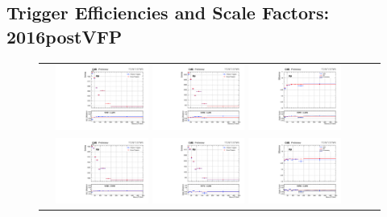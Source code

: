 \clearpage
\subsection{Trigger Efficiencies and Scale Factors: 2016postVFP}
\label{TrigSFResults2016postVFP}

\begin{figure}[!htb]
  \begin{center}
    \begin{tabular}{ccc}
      \includegraphics[width=0.30\textwidth]{fig_2016postVFP_TrigSF/g_lepApt_emu_MC.pdf}
      \includegraphics[width=0.30\textwidth]{fig_2016postVFP_TrigSF/g_lepApt_emu_data.pdf}
      \includegraphics[width=0.30\textwidth]{fig_2016postVFP_TrigSF/g_emu_lepApt_FullSystUncBand.pdf}\\
      \includegraphics[width=0.30\textwidth]{fig_2016postVFP_TrigSF/g_lepBpt_emu_MC.pdf}
      \includegraphics[width=0.30\textwidth]{fig_2016postVFP_TrigSF/g_lepBpt_emu_data.pdf}
      \includegraphics[width=0.30\textwidth]{fig_2016postVFP_TrigSF/g_emu_lepBpt_FullSystUncBand.pdf}\\

\end{tabular}
\end{center}
\end{figure}
